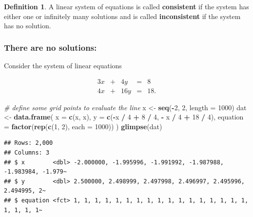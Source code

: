 \documentclass[
]{book}
\newenvironment{Shaded}{\begin{snugshade}}{\end{snugshade}}
\newcommand{\CommentTok}[1]{\textcolor[rgb]{0.56,0.35,0.01}{\textit{#1}}}
\newcommand{\DataTypeTok}[1]{\textcolor[rgb]{0.13,0.29,0.53}{#1}}
\newcommand{\DecValTok}[1]{\textcolor[rgb]{0.00,0.00,0.81}{#1}}
\newcommand{\KeywordTok}[1]{\textcolor[rgb]{0.13,0.29,0.53}{\textbf{#1}}}
\newcommand{\NormalTok}[1]{#1}
\newcommand{\OperatorTok}[1]{\textcolor[rgb]{0.81,0.36,0.00}{\textbf{#1}}}
\newcommand{\StringTok}[1]{\textcolor[rgb]{0.31,0.60,0.02}{#1}}
\theoremstyle{definition}
\newtheorem{definition}{Definition}[chapter]
\theoremstyle{definition}
\theoremstyle{definition}
\theoremstyle{remark}
\begin{document}
\begin{definition}
\protect\hypertarget{def:unnamed-chunk-31}{}{\label{def:unnamed-chunk-31} }A linear system of equations is called \textbf{consistent} if the system has either one or infinitely many solutions and is called \textbf{inconsistent} if the system has no solution.
\end{definition}

\hypertarget{there-are-no-solutions}{%
\subsubsection{There are no solutions:}\label{there-are-no-solutions}}

Consider the system of linear equations

\begin{alignat*}{3}
x   & {}+{} & 4 y & {}={} & 8 \\
4 x & {}+{} & 16 y & {}={} & 18.
\end{alignat*}

\begin{Shaded}
\begin{Highlighting}[]
\CommentTok{# define some grid points to evaluate the line}
\NormalTok{x <-}\StringTok{ }\KeywordTok{seq}\NormalTok{(}\OperatorTok{-}\DecValTok{2}\NormalTok{, }\DecValTok{2}\NormalTok{, }\DataTypeTok{length =} \DecValTok{1000}\NormalTok{)}
\NormalTok{dat <-}\StringTok{ }\KeywordTok{data.frame}\NormalTok{(}
    \DataTypeTok{x =} \KeywordTok{c}\NormalTok{(x, x),}
    \DataTypeTok{y =} \KeywordTok{c}\NormalTok{(}\OperatorTok{-}\NormalTok{x }\OperatorTok{/}\StringTok{ }\DecValTok{4} \OperatorTok{+}\StringTok{ }\DecValTok{8} \OperatorTok{/}\StringTok{ }\DecValTok{4}\NormalTok{, }\OperatorTok{-}\StringTok{ }\NormalTok{x }\OperatorTok{/}\StringTok{ }\DecValTok{4} \OperatorTok{+}\StringTok{ }\DecValTok{18} \OperatorTok{/}\StringTok{ }\DecValTok{4}\NormalTok{),}
    \DataTypeTok{equation =} \KeywordTok{factor}\NormalTok{(}\KeywordTok{rep}\NormalTok{(}\KeywordTok{c}\NormalTok{(}\DecValTok{1}\NormalTok{, }\DecValTok{2}\NormalTok{), }\DataTypeTok{each =} \DecValTok{1000}\NormalTok{))}
\NormalTok{)}
\KeywordTok{glimpse}\NormalTok{(dat)}
\end{Highlighting}
\end{Shaded}

\begin{verbatim}
## Rows: 2,000
## Columns: 3
## $ x        <dbl> -2.000000, -1.995996, -1.991992, -1.987988, -1.983984, -1.979~
## $ y        <dbl> 2.500000, 2.498999, 2.497998, 2.496997, 2.495996, 2.494995, 2~
## $ equation <fct> 1, 1, 1, 1, 1, 1, 1, 1, 1, 1, 1, 1, 1, 1, 1, 1, 1, 1, 1, 1, 1~
\end{verbatim}
\end{document}
